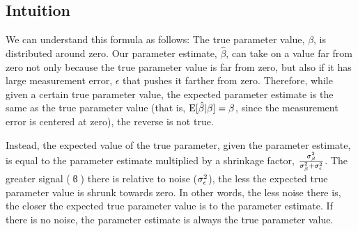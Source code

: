 \documentclass[12pt]{article}
\begin{document}
\subsection{Intuition}
We can understand this formula as follows:
The true parameter value, $\beta$, is distributed around zero.
Our parameter estimate, $\hat{\beta}$, can take on a value far from zero not only because the true parameter value is far from zero, but also if it has large measurement error, $\epsilon$ that pushes it farther from zero.
Therefore, while given a certain true parameter value, the expected parameter estimate is the same as the true parameter value (that is, $\mathrm{E}[\hat{\beta} | \beta] = \beta$, since the measurement error is centered at zero), the reverse is not true.

Instead, the expected value of the true parameter, given the parameter estimate, is equal to the parameter estimate multiplied by a shrinkage factor, $\frac{\sigma_{\beta}^2}{\sigma_{\beta}^2 + \sigma_{\epsilon}^2}$.
The greater signal ($\varbeta$) there is relative to noise ($\sigma_{\epsilon}^2$), the less the expected true parameter value is shrunk towards zero.
In other words, the less noise there is, the closer the expected true parameter value is to the parameter estimate.
If there is no noise, the parameter estimate is always the true parameter value.
\end{document}
